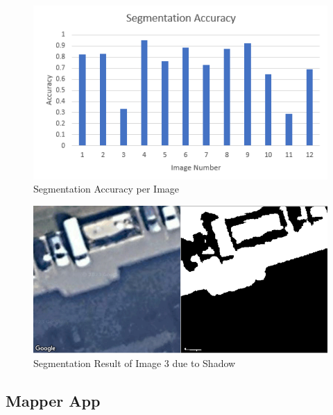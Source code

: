 \documentclass[12pt, titlepage]{article}
\begin{document}
\begin{figure}[h!]
  \begin{center} 
  \caption{Segmentation Accuracy per Image}
  \label{fig:segAccuracy}
        \includegraphics[width=1\textwidth]{VnVReport/SegmentationAccuracy.png}
  \end{center}
\end{figure}

\begin{figure}[h!]
  \begin{center} 
  \caption{Segmentation Result of Image 3 due to Shadow}
  \label{fig:segShadow}
        \includegraphics[width=1\textwidth]{VnVReport/SegmentationShadow.png}
  \end{center}
\end{figure}

\clearpage

\subsection{Mapper App}
\label{subsec:mapperApp}
\end{document}
